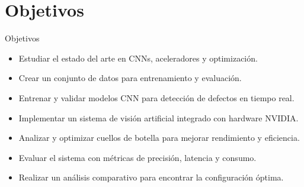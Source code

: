 \documentclass[spanish]{beamer}
\begin{document}

\section{Objetivos}
\begin{frame}{Objetivos}
    \begin{itemize}
        \item Estudiar el estado del arte en CNNs, aceleradores y optimización.
        \item Crear un conjunto de datos para entrenamiento y evaluación.
        \item Entrenar y validar modelos CNN para detección de defectos en tiempo real.
        \item Implementar un sistema de visión artificial integrado con hardware NVIDIA.
        \item Analizar y optimizar cuellos de botella para mejorar rendimiento y eficiencia.
        \item Evaluar el sistema con métricas de precisión, latencia y consumo.
        \item Realizar un análisis comparativo para encontrar la configuración óptima.
    \end{itemize}
\end{frame}
\end{document}
